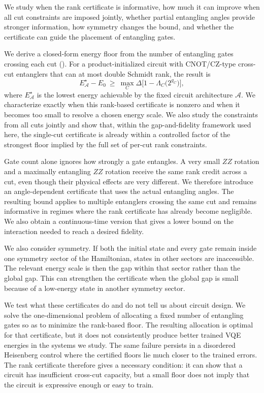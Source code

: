 \documentclass[reprint,aps,pra,floatfix,superscriptaddress,nofootinbib,longbibliography]{revtex4-2}
\theoremstyle{remark}
\theoremstyle{definition}
\newcommand{\calA}{\mathcal{A}}
\begin{document}
We study when the rank certificate is informative, how much it can improve when
all cut constraints are imposed jointly, whether partial entangling angles
provide stronger information, how symmetry changes the bound, and whether the
certificate can guide the placement of entangling gates.

We derive a closed-form energy floor from the number of entangling gates
crossing each cut (). For a product-initialized circuit with
CNOT/CZ-type cross-cut entanglers that can at most double Schmidt rank, the
result is
\begin{equation*}
  E_{\calA}^{\star}-E_0\ \ge\
  \max_C\Delta\bigl[1-\Lambda_C\bigl(2^{g_C}\bigr)\bigr],
\end{equation*}
where $E_{\calA}^{\star}$ is the lowest energy achievable by the fixed circuit
architecture $\calA$. We characterize exactly when this rank-based certificate is
nonzero and when it becomes too small to resolve a chosen energy scale. We also
study the constraints from all cuts jointly and show that, within the
gap-and-fidelity framework used here, the single-cut certificate is
already within a controlled factor of the strongest floor implied by the full set
of per-cut rank constraints.

Gate count alone ignores how strongly a gate entangles. A very small $ZZ$
rotation and a maximally entangling $ZZ$ rotation receive the same rank credit
across a cut, even though their physical effects are very different. We
therefore introduce an angle-dependent certificate that uses the actual
entangling angles. The resulting bound applies to multiple entanglers crossing
the same cut and remains informative in regimes where the rank certificate has
already become negligible. We also obtain a continuous-time version that gives
a lower bound on the interaction needed to reach a desired fidelity.

We also consider symmetry. If both the initial state and every gate remain
inside one symmetry sector of the Hamiltonian, states in other sectors are
inaccessible. The relevant energy scale is then the gap within that sector rather
than the global gap. This can strengthen the certificate when the
global gap is small because of a low-energy state in another symmetry sector.

We test what these certificates do and do not tell us about circuit design. We
solve the one-dimensional problem of allocating a fixed number of entangling
gates so as to minimize the rank-based floor. The resulting allocation is
optimal for that certificate, but it does not consistently produce better
trained VQE energies in the systems we study. The same failure persists in a
disordered Heisenberg control where the certified floors lie much closer to the
trained errors. The rank certificate therefore gives a necessary condition: it can show that a circuit has insufficient
cross-cut capacity, but a small floor does not imply that the circuit is
expressive enough or easy to train.
\end{document}
